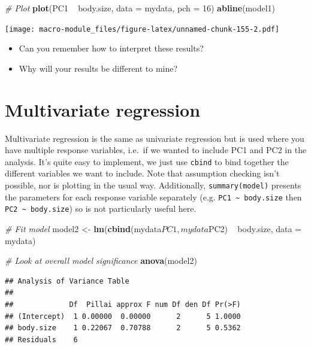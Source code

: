 \documentclass[]{book}
\newenvironment{Shaded}{\begin{snugshade}}{\end{snugshade}}
\newcommand{\KeywordTok}[1]{\textcolor[rgb]{0.13,0.29,0.53}{\textbf{{#1}}}}
\newcommand{\DataTypeTok}[1]{\textcolor[rgb]{0.13,0.29,0.53}{{#1}}}
\newcommand{\DecValTok}[1]{\textcolor[rgb]{0.00,0.00,0.81}{{#1}}}
\newcommand{\StringTok}[1]{\textcolor[rgb]{0.31,0.60,0.02}{{#1}}}
\newcommand{\CommentTok}[1]{\textcolor[rgb]{0.56,0.35,0.01}{\textit{{#1}}}}
\newcommand{\NormalTok}[1]{{#1}}
\providecommand{\tightlist}{%
  \setlength{\itemsep}{0pt}\setlength{\parskip}{0pt}}
\begin{document}
\begin{Shaded}
\begin{Highlighting}[]
\CommentTok{# Plot}
\KeywordTok{plot}\NormalTok{(PC1 ~}\StringTok{ }\NormalTok{body.size, }\DataTypeTok{data =} \NormalTok{mydata, }\DataTypeTok{pch =} \DecValTok{16}\NormalTok{)}
\KeywordTok{abline}\NormalTok{(model1)}
\end{Highlighting}
\end{Shaded}

\texttt{[image: macro-module\_files/figure-latex/unnamed-chunk-155-2.pdf]}

\begin{itemize}
\tightlist
\item
  Can you remember how to interpret these results?
\item
  Why will your results be different to mine?
\end{itemize}

\section{Multivariate regression}\label{multivariate-regression}

Multivariate regression is the same as univariate regression but is used
where you have multiple response variables, i.e.~if we wanted to include
PC1 and PC2 in the analysis. It's quite easy to implement, we just use
\texttt{cbind} to bind together the different variables we want to
include. Note that assumption checking isn't possible, nor is plotting
in the usual way. Additionally, \texttt{summary(model)} presents the
parameters for each response variable separately (e.g.
\texttt{PC1\ \textasciitilde{}\ body.size} then
\texttt{PC2\ \textasciitilde{}\ body.size}) so is not particularly
useful here.

\begin{Shaded}
\begin{Highlighting}[]
\CommentTok{# Fit model}
\NormalTok{model2 <-}\StringTok{ }\KeywordTok{lm}\NormalTok{(}\KeywordTok{cbind}\NormalTok{(mydata$PC1,mydata$PC2) ~}\StringTok{ }\NormalTok{body.size, }\DataTypeTok{data =} \NormalTok{mydata)}

\CommentTok{# Look at overall model significance}
\KeywordTok{anova}\NormalTok{(model2)}
\end{Highlighting}
\end{Shaded}

\begin{verbatim}
## Analysis of Variance Table
## 
##             Df  Pillai approx F num Df den Df Pr(>F)
## (Intercept)  1 0.00000  0.00000      2      5 1.0000
## body.size    1 0.22067  0.70788      2      5 0.5362
## Residuals    6
\end{verbatim}
\end{document}

